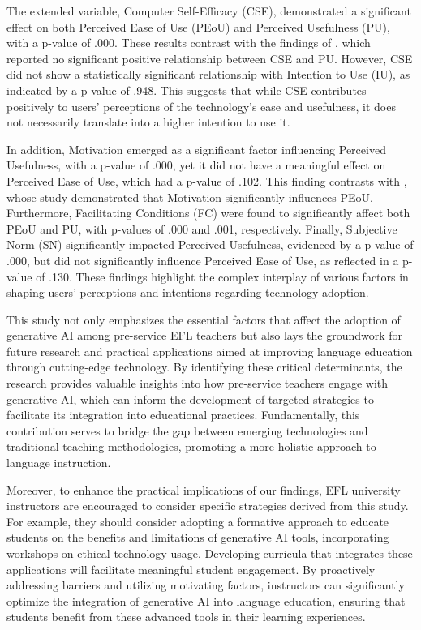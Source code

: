 \documentclass[english]{textolivre}
\begin{document}
The extended variable, Computer Self-Efficacy (CSE), demonstrated a significant effect on both Perceived Ease of Use (PEoU) and Perceived Usefulness (PU), with a p-value of .000. These results contrast with the findings of \textcite{JiangEtAl2021GETAMELearning}, which reported no significant positive relationship between CSE and PU. However, CSE did not show a statistically significant relationship with Intention to Use (IU), as indicated by a p-value of .948. This suggests that while CSE contributes positively to users’ perceptions of the technology’s ease and usefulness, it does not necessarily translate into a higher intention to use it.

In addition, Motivation emerged as a significant factor influencing Perceived Usefulness, with a p-value of .000, yet it did not have a meaningful effect on Perceived Ease of Use, which had a p-value of .102. This finding contrasts with \textcite{WangDuZou2025MultimodalAI}, whose study demonstrated that Motivation significantly influences PEoU. Furthermore, Facilitating Conditions (FC) were found to significantly affect both PEoU and PU, with p-values of .000 and .001, respectively. Finally, Subjective Norm (SN) significantly impacted Perceived Usefulness, evidenced by a p-value of .000, but did not significantly influence Perceived Ease of Use, as reflected in a p-value of .130. These findings highlight the complex interplay of various factors in shaping users’ perceptions and intentions regarding technology adoption.

This study not only emphasizes the essential factors that affect the adoption of generative AI among pre-service EFL teachers but also lays the groundwork for future research and practical applications aimed at improving language education through cutting-edge technology. By identifying these critical determinants, the research provides valuable insights into how pre-service teachers engage with generative AI, which can inform the development of targeted strategies to facilitate its integration into educational practices. Fundamentally, this contribution serves to bridge the gap between emerging technologies and traditional teaching methodologies, promoting a more holistic approach to language instruction.

Moreover, to enhance the practical implications of our findings, EFL university instructors are encouraged to consider specific strategies derived from this study. For example, they should consider adopting a formative approach to educate students on the benefits and limitations of generative AI tools, incorporating workshops on ethical technology usage. Developing curricula that integrates these applications will facilitate meaningful student engagement. By proactively addressing barriers and utilizing motivating factors, instructors can significantly optimize the integration of generative AI into language education, ensuring that students benefit from these advanced tools in their learning experiences.
\end{document}
